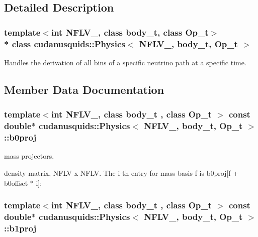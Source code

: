\subsection{Detailed Description}
\subsubsection*{template$<$int N\+F\+L\+V\+\_\+, class body\+\_\+t, class Op\+\_\+t$>$\\*
class cudanusquids\+::\+Physics$<$ N\+F\+L\+V\+\_\+, body\+\_\+t, Op\+\_\+t $>$}

Handles the derivation of all bins of a specific neutrino path at a specific time. 

\subsection{Member Data Documentation}
\subsubsection[{\texorpdfstring{b0proj}{b0proj}}]{\setlength{\rightskip}{0pt plus 5cm}template$<$int N\+F\+L\+V\+\_\+, class body\+\_\+t , class Op\+\_\+t $>$ const double$\ast$ {\bf cudanusquids\+::\+Physics}$<$ N\+F\+L\+V\+\_\+, body\+\_\+t, Op\+\_\+t $>$\+::b0proj}\hypertarget{structcudanusquids_1_1Physics_ac18048b4896ce37db168be19538fbfde}{}\label{structcudanusquids_1_1Physics_ac18048b4896ce37db168be19538fbfde}


mass projectors. 

density matrix, N\+F\+LV x N\+F\+LV. The i-\/th entry for mass basis f is b0proj\mbox{[}f + b0offset $\ast$ i\mbox{]}; 
\subsubsection[{\texorpdfstring{b1proj}{b1proj}}]{\setlength{\rightskip}{0pt plus 5cm}template$<$int N\+F\+L\+V\+\_\+, class body\+\_\+t , class Op\+\_\+t $>$ const double$\ast$ {\bf cudanusquids\+::\+Physics}$<$ N\+F\+L\+V\+\_\+, body\+\_\+t, Op\+\_\+t $>$\+::b1proj}\hypertarget{structcudanusquids_1_1Physics_a31d89b9634cc518ba1106717dd76de15}{}\label{structcudanusquids_1_1Physics_a31d89b9634cc518ba1106717dd76de15}



